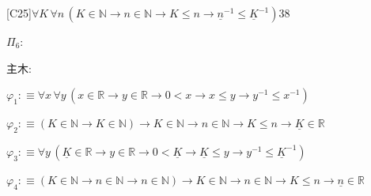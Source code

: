 \begin{fullproof}{[C25]}{$\forall K\,\forall n\,(K \in \mathbb{N} \to n \in \mathbb{N} \to K \leq n \to \underline{n}^{-1} \leq \underline{K}^{-1})$}{38}
\begin{ptree}
\noLine
{}
\end{ptree}
\noindent$\Pi_{6}$:
\begin{ptree}
\noLine
{}
\noLine
{}
\noLine
{}
\end{ptree}
\noindent 主木:
\begin{ptree}
\noLine
{}
\end{ptree}
\begin{abbrevlist}
\item $\varphi_{1} :\equiv \forall x\,\forall y\,(x \in \mathbb{R} \to y \in \mathbb{R} \to 0 < x \to x \leq y \to y^{-1} \leq x^{-1})$
\item $\varphi_{2} :\equiv (K \in \mathbb{N} \to K \in \mathbb{N}) \to K \in \mathbb{N} \to n \in \mathbb{N} \to K \leq n \to \underline{K} \in \mathbb{R}$
\item $\varphi_{3} :\equiv \forall y\,(\underline{K} \in \mathbb{R} \to y \in \mathbb{R} \to 0 < \underline{K} \to \underline{K} \leq y \to y^{-1} \leq \underline{K}^{-1})$
\item $\varphi_{4} :\equiv (K \in \mathbb{N} \to n \in \mathbb{N} \to n \in \mathbb{N}) \to K \in \mathbb{N} \to n \in \mathbb{N} \to K \leq n \to \underline{n} \in \mathbb{R}$

\end{abbrevlist}
\end{fullproof}
